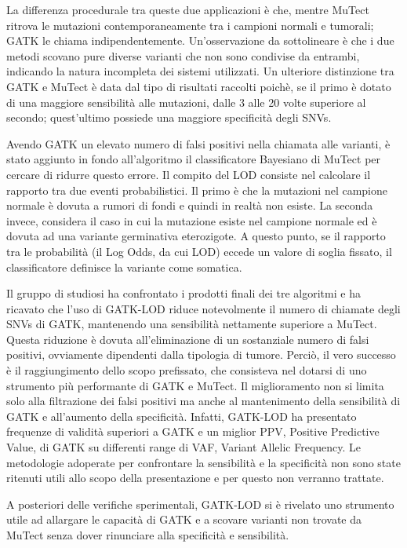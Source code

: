 La differenza procedurale tra queste due applicazioni è che, mentre MuTect ritrova le mutazioni contemporaneamente tra i campioni normali e tumorali; GATK le chiama indipendentemente.
Un'osservazione da sottolineare è che i due metodi scovano pure diverse varianti che non sono condivise da entrambi, indicando la natura incompleta dei sistemi utilizzati.
Un ulteriore distinzione tra GATK e MuTect è data dal tipo di risultati raccolti poichè, se il primo è dotato di una maggiore sensibilità alle mutazioni, dalle 3 alle 20 volte superiore al secondo; quest'ultimo possiede una maggiore specificità degli SNVs.

Avendo GATK un elevato numero di falsi positivi nella chiamata alle varianti, è stato aggiunto in fondo all'algoritmo il classificatore Bayesiano di MuTect per cercare di ridurre questo errore.
Il compito del LOD consiste nel calcolare il rapporto tra due eventi probabilistici.
Il primo è che la mutazioni nel campione normale è dovuta a rumori di fondi e quindi in realtà non esiste.
La seconda invece, considera il caso in cui la mutazione esiste nel campione normale ed è dovuta ad una variante germinativa eterozigote.
A questo punto, se il rapporto tra le probabilità (il Log Odds, da cui LOD) eccede un valore di soglia fissato, il classificatore definisce la variante come somatica.

Il gruppo di studiosi ha confrontato i prodotti finali dei tre algoritmi e ha ricavato che l'uso di GATK-LOD riduce notevolmente il numero di chiamate degli SNVs di GATK, mantenendo una sensibilità nettamente superiore a MuTect.
Questa riduzione è dovuta all'eliminazione di un sostanziale numero di falsi positivi, ovviamente dipendenti dalla tipologia di tumore.
Perciò, il vero successo è il raggiungimento dello scopo prefissato, che consisteva nel dotarsi di uno strumento più performante di GATK e MuTect.
Il miglioramento non si limita solo alla filtrazione dei falsi positivi ma anche al mantenimento della sensibilità di GATK e all'aumento della specificità.
Infatti, GATK-LOD ha presentato frequenze di validità superiori a GATK e un miglior PPV, Positive Predictive Value, di GATK su differenti range di VAF, Variant Allelic Frequency.
Le metodologie adoperate per confrontare la sensibilità e la specificità non sono state ritenuti utili allo scopo della presentazione e per questo non verranno trattate.

A posteriori delle verifiche sperimentali, GATK-LOD si è rivelato uno strumento utile ad allargare le capacità di GATK e a scovare varianti non trovate da MuTect senza dover rinunciare alla specificità e sensibilità.

